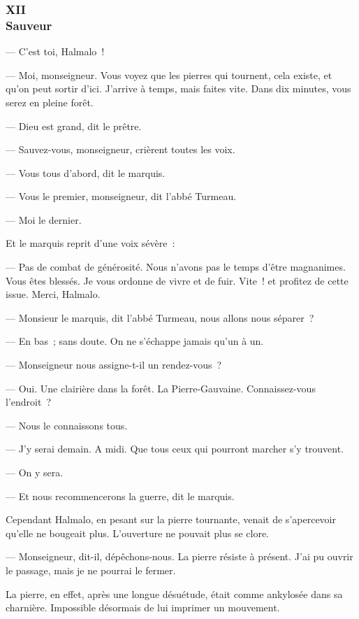 \documentclass[french,twoside]{book} %
\begin{document}
 \subsubsection[{XII. Sauveur}]{XII \\
Sauveur}
\label{p3l4c12}
\noindent — C’est toi, Halmalo !\par
— Moi, monseigneur. Vous voyez que les pierres qui tournent, cela existe, et qu’on peut sortir d’ici. J’arrive à temps, mais faites vite. Dans dix minutes, vous serez en pleine forêt.\par
— Dieu est grand, dit le prêtre.\par
— Sauvez-vous, monseigneur, crièrent toutes les voix.\par
— Vous tous d’abord, dit le marquis.\par
— Vous le premier, monseigneur, dit l’abbé Turmeau.\par
— Moi le dernier.\par
Et le marquis reprit d’une voix sévère :\par
— Pas de combat de générosité. Nous n’avons pas le temps d’être magnanimes. Vous êtes blessés. Je vous ordonne de vivre et de fuir. Vite ! et profitez de cette issue. Merci, Halmalo.\par
— Monsieur le marquis, dit l’abbé Turmeau, nous allons nous séparer ?\par
— En bas ; sans doute. On ne s’échappe jamais qu’un à un.\par
— Monseigneur nous assigne-t-il un rendez-vous ?\par
 — Oui. Une clairière dans la forêt. La Pierre-Gauvaine. Connaissez-vous l’endroit ?\par
— Nous le connaissons tous.\par
— J’y serai demain. A midi. Que tous ceux qui pourront marcher s’y trouvent.\par
— On y sera.\par
— Et nous recommencerons la guerre, dit le marquis.\par
Cependant Halmalo, en pesant sur la pierre tournante, venait de s’apercevoir qu’elle ne bougeait plus. L’ouverture ne pouvait plus se clore.\par
— Monseigneur, dit-il, dépêchons-nous. La pierre résiste à présent. J’ai pu ouvrir le passage, mais je ne pourrai le fermer.\par
La pierre, en effet, après une longue désuétude, était comme ankylosée dans sa charnière. Impossible désormais de lui imprimer un mouvement.\par
\end{document}
